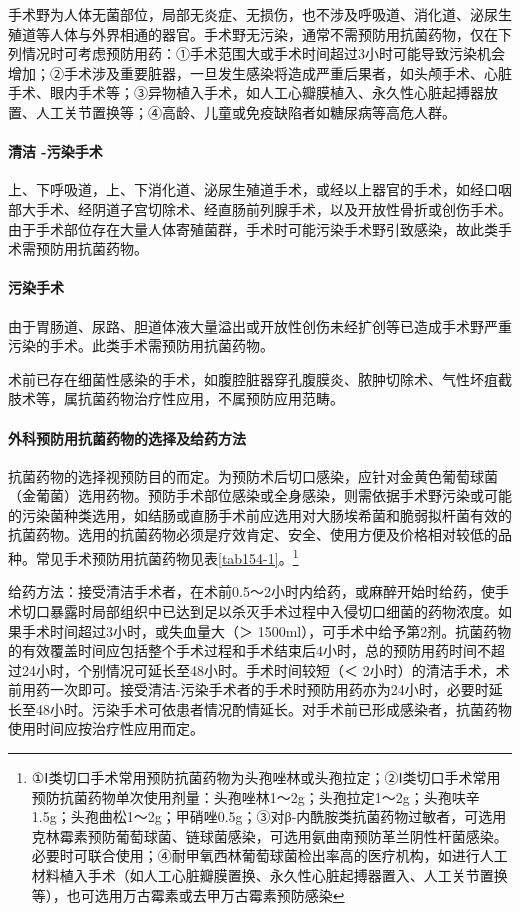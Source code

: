手术野为人体无菌部位，局部无炎症、无损伤，也不涉及呼吸道、消化道、泌尿生殖道等人体与外界相通的器官。手术野无污染，通常不需预防用抗菌药物，仅在下列情况时可考虑预防用药：①手术范围大或手术时间超过3小时可能导致污染机会增加；②手术涉及重要脏器，一旦发生感染将造成严重后果者，如头颅手术、心脏手术、眼内手术等；③异物植入手术，如人工心瓣膜植入、永久性心脏起搏器放置、人工关节置换等；④高龄、儿童或免疫缺陷者如糖尿病等高危人群。

\paragraph{清洁 -污染手术}

上、下呼吸道，上、下消化道、泌尿生殖道手术，或经以上器官的手术，如经口咽部大手术、经阴道子宫切除术、经直肠前列腺手术，以及开放性骨折或创伤手术。由于手术部位存在大量人体寄殖菌群，手术时可能污染手术野引致感染，故此类手术需预防用抗菌药物。

\paragraph{污染手术}

由于胃肠道、尿路、胆道体液大量溢出或开放性创伤未经扩创等已造成手术野严重污染的手术。此类手术需预防用抗菌药物。

术前已存在细菌性感染的手术，如腹腔脏器穿孔腹膜炎、脓肿切除术、气性坏疽截肢术等，属抗菌药物治疗性应用，不属预防应用范畴。

\paragraph{外科预防用抗菌药物的选择及给药方法}

抗菌药物的选择视预防目的而定。为预防术后切口感染，应针对金黄色葡萄球菌（金葡菌）选用药物。预防手术部位感染或全身感染，则需依据手术野污染或可能的污染菌种类选用，如结肠或直肠手术前应选用对大肠埃希菌和脆弱拟杆菌有效的抗菌药物。选用的抗菌药物必须是疗效肯定、安全、使用方便及价格相对较低的品种。常见手术预防用抗菌药物见表\ref{tab154-1}。\footnote{①Ⅰ类切口手术常用预防抗菌药物为头孢唑林或头孢拉定；②Ⅰ类切口手术常用预防抗菌药物单次使用剂量：头孢唑林1～2g；头孢拉定1～2g；头孢呋辛1.5g；头孢曲松1～2g；甲硝唑0.5g；③对β-内酰胺类抗菌药物过敏者，可选用克林霉素预防葡萄球菌、链球菌感染，可选用氨曲南预防革兰阴性杆菌感染。必要时可联合使用；④耐甲氧西林葡萄球菌检出率高的医疗机构，如进行人工材料植入手术（如人工心脏瓣膜置换、永久性心脏起搏器置入、人工关节置换等），也可选用万古霉素或去甲万古霉素预防感染}

给药方法：接受清洁手术者，在术前0.5～2小时内给药，或麻醉开始时给药，使手术切口暴露时局部组织中已达到足以杀灭手术过程中入侵切口细菌的药物浓度。如果手术时间超过3小时，或失血量大（＞
1500ml），可手术中给予第2剂。抗菌药物的有效覆盖时间应包括整个手术过程和手术结束后4小时，总的预防用药时间不超过24小时，个别情况可延长至48小时。手术时间较短（＜
2小时）的清洁手术，术前用药一次即可。接受清洁-污染手术者的手术时预防用药亦为24小时，必要时延长至48小时。污染手术可依患者情况酌情延长。对手术前已形成感染者，抗菌药物使用时间应按治疗性应用而定。

